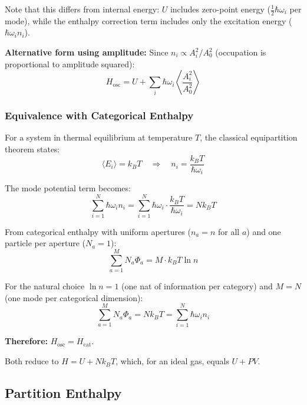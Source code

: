 Note that this differs from internal energy: $U$ includes zero-point energy ($\frac{1}{2}\hbar\omega_i$ per mode), while the enthalpy correction term includes only the excitation energy ($\hbar\omega_i n_i$).

\textbf{Alternative form using amplitude:} Since $n_i \propto A_i^2/A_0^2$ (occupation is proportional to amplitude squared):
\begin{equation}
H_{\text{osc}} = U + \sum_i \hbar\omega_i \left\langle \frac{A_i^2}{A_0^2} \right\rangle
\end{equation}

\subsubsection{Equivalence with Categorical Enthalpy}

For a system in thermal equilibrium at temperature $T$, the classical equipartition theorem states:
\begin{equation}
\langle E_i \rangle = k_B T \quad \Rightarrow \quad n_i = \frac{k_B T}{\hbar\omega_i}
\end{equation}

The mode potential term becomes:
\begin{equation}
\sum_{i=1}^{N} \hbar\omega_i n_i = \sum_{i=1}^{N} \hbar\omega_i \cdot \frac{k_B T}{\hbar\omega_i} = N k_B T
\end{equation}

From categorical enthalpy with uniform apertures ($n_a = n$ for all $a$) and one particle per aperture ($N_a = 1$):
\begin{equation}
\sum_{a=1}^{M} N_a \Phi_a = M \cdot k_B T \ln n
\end{equation}

For the natural choice $\ln n = 1$ (one nat of information per category) and $M = N$ (one mode per categorical dimension):
\begin{equation}
\sum_{a=1}^{M} N_a \Phi_a = N k_B T = \sum_{i=1}^{N} \hbar\omega_i n_i
\end{equation}

\textbf{Therefore:} $H_{\text{osc}} = H_{\text{cat}}$.

Both reduce to $H = U + Nk_BT$, which, for an ideal gas, equals $U + PV$.

\subsection{Partition Enthalpy}

